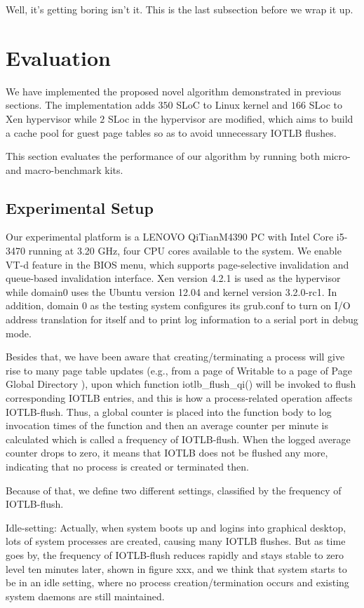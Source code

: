\documentclass[letterpaper,twocolumn,10pt]{article}
\begin{document}
Well, it's getting boring isn't it.  This is the last subsection
before we wrap it up.

\section{Evaluation}

We have implemented the proposed novel algorithm demonstrated in previous sections. The implementation adds $350$ SLoC to Linux kernel and $166$ SLoc to Xen hypervisor while $2$ SLoc in the hypervisor are modified, which aims to build a cache pool for guest page tables so as to avoid unnecessary IOTLB flushes.

This section evaluates the performance of our algorithm by running both micro- and macro-benchmark kits.

\subsection{Experimental Setup}

Our experimental platform is a LENOVO QiTianM4390 PC with Intel Core i5-3470 running at 3.20 GHz, four CPU cores available to the system. We enable VT-d feature in the BIOS menu, which supports page-selective invalidation and queue-based invalidation interface. Xen version 4.2.1 is used as the hypervisor while domain0 uses the Ubuntu version 12.04 and kernel version 3.2.0-rc1. In addition, domain 0 as the testing system configures its grub.conf to turn on I/O address translation for itself and to print log information to a serial port in debug mode.

Besides that, we have been aware that creating/terminating a process will give rise to many page table updates (e.g., from a page of Writable to a page of Page Global Directory ), upon which function iotlb\_flush\_qi() will be invoked to flush corresponding IOTLB entries, and this is how a process-related operation affects IOTLB-flush. Thus, a global counter is placed into the function body to log invocation times of the function and then an average counter per minute is calculated which is called a frequency of IOTLB-flush. When the logged average counter drops to zero, it means that IOTLB does not be flushed any more, indicating that no process is created or terminated then.

Because of that, we define two different settings, classified by the frequency of IOTLB-flush.

Idle-setting: Actually, when system boots up and logins into graphical desktop, lots of system processes are created, causing many IOTLB flushes. But as time goes by, the frequency of IOTLB-flush reduces rapidly and stays stable to zero level ten minutes later, shown in figure xxx, and we think that system starts to be in an idle setting, where no process creation/termination occurs and existing system daemons are still maintained.
\end{document}
